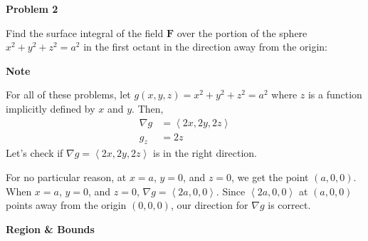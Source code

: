 \documentclass{article}
\newcommand{\lra}[1]{\left\langle #1 \right\rangle}
\newcommand{\F}[0]{\mathbf{F}}
\begin{document}
{}\textbf{Problem 2}

Find the surface integral of the field $\F$ over the portion of the sphere $x^2+y^2+z^2=a^2$ in the first octant in the direction away from the origin:

{}\textbf{Note}

For all of these problems, let $g(x,y,z)=x^2+y^2+z^2=a^2$ where $z$ is a function implicitly defined by $x$ and $y$. Then,
\begin{align*}
    \nabla g &=\lra{2x,2y,2z}\\
    g_z &= 2z
\end{align*}
Let's check if $\nabla g =\lra{2x,2y,2z}$ is in the right direction.

For no particular reason, at $x=a$, $y=0$, and $z=0$, we get the point $(a,0,0)$. When $x=a$, $y=0$, and $z=0$, $\nabla g =\lra{2a, 0,0}$. Since $\lra{2a,0,0}$ at $(a,0,0)$ points away from the origin $(0,0,0)$, our direction for $\nabla g$ is correct.
\begin{center}
\end{center}
{}\textbf{Region \& Bounds}
\end{document}
